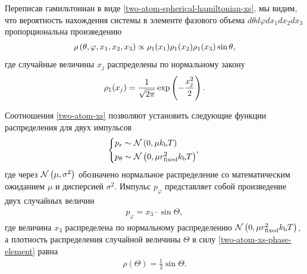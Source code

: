 Переписав гамильтониан в виде \eqref{two-atom-spherical-hamiltonian-xs}, мы видим, что вероятность нахождения системы в элементе фазового объема $d\theta d\varphi dx_1 dx_2 dx_3$ пропорциональна произведению 
\begin{gather}
    \rho \left( \theta, \varphi, x_1, x_2, x_3 \right) \propto \rho_1(x_1) \rho_1(x_2) \rho_1(x_3) \sin \theta, \label{two-atom-xs-phase-element}
\end{gather}
%
где случайные величины $x_j$ распределены по нормальному закону
\begin{gather}
    \rho_1 (x_j) = \frac{1}{\sqrt{2 \pi}} \exp \left( -\frac{x_j^2}{2} \right). 
\end{gather}

Соотношения \eqref{two-atom-xs} позволяют установить следующие функции распределения для двух импульсов
\begin{gather}
    \left\{
    \begin{aligned}
        p_r &\sim \mathcal{N} \left( 0, \mu k_\text{b} T \right) \\
        p_\theta &\sim \mathcal{N} \left( 0, \mu r_\text{fixed}^2 k_\text{b} T \right) 
    \end{aligned},
    \right.
\end{gather}
%
где через $\mathcal{N} \left( \mu, \sigma^2 \right)$ обозначено нормальное распределение со математическим ожиданием $\mu$ и дисперсией $\sigma^2$. Импульс $p_\varphi$ представляет собой произведение двух случайных величин
\begin{gather}
    p_\varphi = x_3 \cdot \sin \Theta, \label{two-atom-pvarphi-generation}
\end{gather}
% 
где величина $x_3$ распределена по нормальному распределению $\mathcal{N} \left( 0, \mu r_\text{fixed}^2 k_\text{b} T \right)$, а плотность распределения случайной величины $\Theta$ в силу \eqref{two-atom-xs-phase-element} равна
\begin{gather}
    \rho(\Theta) = \frac{1}{2} \sin \Theta.
\end{gather}

